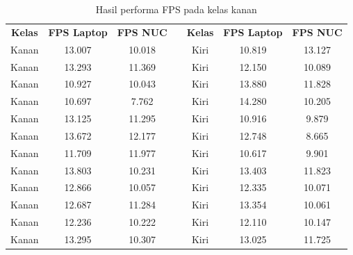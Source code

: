 \begin{longtable}{|c|c|c|c|c|c|c|}
  \caption{Hasil performa FPS pada kelas kanan}
  \label{tb:fpskanankiri} \\
  \cline{1-3} \cline{5-7}
  \rowcolor[HTML]{C0C0C0} 
  \textbf{Kelas} & \textbf{FPS Laptop} & \textbf{FPS NUC} &\cellcolor[HTML]{FFFFFF}  & \textbf{Kelas} & \textbf{FPS Laptop} & \textbf{FPS NUC} \\ \cline{1-3} \cline{5-7} 
  Kanan          & 13.007              & 10.018           &  & Kiri           & 10.819              & 13.127           \\ \cline{1-3} \cline{5-7} 
  Kanan          & 13.293              & 11.369           &  & Kiri           & 12.150              & 10.089           \\ \cline{1-3} \cline{5-7} 
  Kanan          & 10.927              & 10.043           &  & Kiri           & 13.880              & 11.828           \\ \cline{1-3} \cline{5-7} 
  Kanan          & 10.697              & 7.762            &  & Kiri           & 14.280              & 10.205           \\ \cline{1-3} \cline{5-7} 
  Kanan          & 13.125              & 11.295           &  & Kiri           & 10.916              & 9.879            \\ \cline{1-3} \cline{5-7} 
  Kanan          & 13.672              & 12.177           &  & Kiri           & 12.748              & 8.665            \\ \cline{1-3} \cline{5-7} 
  Kanan          & 11.709              & 11.977           &  & Kiri           & 10.617              & 9.901            \\ \cline{1-3} \cline{5-7} 
  Kanan          & 13.803              & 10.231           &  & Kiri           & 13.403              & 11.823           \\ \cline{1-3} \cline{5-7} 
  Kanan          & 12.866              & 10.057           &  & Kiri           & 12.335              & 10.071           \\ \cline{1-3} \cline{5-7} 
  Kanan          & 12.687              & 11.284           &  & Kiri           & 13.354              & 10.061           \\ \cline{1-3} \cline{5-7} 
  Kanan          & 12.236              & 10.222           &  & Kiri           & 12.110              & 10.147           \\ \cline{1-3} \cline{5-7} 
  Kanan          & 13.295              & 10.307           &  & Kiri           & 13.025              & 11.725           \\ \cline{1-3} \cline{5-7} 

\end{longtable}
